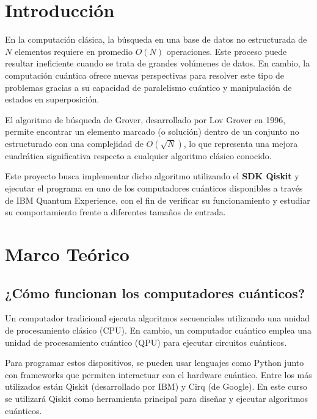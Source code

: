 \documentclass{article}
\begin{document}
\section{Introducción}\label{sec:intr}

En la computación clásica, la búsqueda en una base de datos no estructurada de $N$ elementos requiere en promedio $O(N)$ operaciones. Este proceso puede resultar ineficiente cuando se trata de grandes volúmenes de datos. En cambio, la computación cuántica ofrece nuevas perspectivas para resolver este tipo de problemas gracias a su capacidad de paralelismo cuántico y manipulación de estados en superposición.

El algoritmo de búsqueda de Grover, desarrollado por Lov Grover en 1996, permite encontrar un elemento marcado (o solución) dentro de un conjunto no estructurado con una complejidad de $O(\sqrt{N})$, lo que representa una mejora cuadrática significativa respecto a cualquier algoritmo clásico conocido.

Este proyecto busca implementar dicho algoritmo utilizando el \textbf{SDK Qiskit} y ejecutar el programa en uno de los computadores cuánticos disponibles a través de IBM Quantum Experience, con el fin de verificar su funcionamiento y estudiar su comportamiento frente a diferentes tamaños de entrada.


\section{Marco Teórico}\label{sec:marc}

\subsection*{¿Cómo funcionan los computadores cuánticos?}

Un computador tradicional ejecuta algoritmos secuenciales utilizando una unidad de procesamiento clásico (CPU). En cambio, un computador cuántico emplea una unidad de procesamiento cuántico (QPU) para ejecutar circuitos cuánticos.

Para programar estos dispositivos, se pueden usar lenguajes como Python junto con frameworks que permiten interactuar con el hardware cuántico. Entre los más utilizados están Qiskit (desarrollado por IBM) y Cirq (de Google). En este curso se utilizará Qiskit como herramienta principal para diseñar y ejecutar algoritmos cuánticos.
\end{document}

